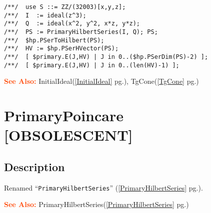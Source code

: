 \documentclass[a4paper]{mybook}
\newenvironment{command}{}{} %
\newcommand\SeeAlso{\par\textcolor{OrangeRed}{\textbf{\large See Also: }}}
\begin{document}
\begin{command}
\begin{Verbatim}[label=example, rulecolor=\color{PineGreen}, frame=single]
/**/  use S ::= ZZ/(32003)[x,y,z];
/**/  I  := ideal(z^3);
/**/  Q  := ideal(x^2, y^2, x*z, y*z);
/**/  PS := PrimaryHilbertSeries(I, Q); PS;
/**/  $hp.PSerToHilbert(PS);
/**/  HV := $hp.PSerHVector(PS);
/**/  [ $primary.E(J,HV) | J in 0..($hp.PSerDim(PS)-2) ];
/**/  [ $primary.E(J,HV) | J in 0..(len(HV)-1) ];
\end{Verbatim}


\SeeAlso %
  InitialIdeal(\ref{InitialIdeal} pg.\pageref{InitialIdeal}), 
    TgCone(\ref{TgCone} pg.\pageref{TgCone})
\end{command} %

\section{PrimaryPoincare [OBSOLESCENT]}
\label{PrimaryPoincare [OBSOLESCENT]}
\begin{command} %



\subsection*{Description}

Renamed ``\verb&PrimaryHilbertSeries&'' (\ref{PrimaryHilbertSeries} pg.\pageref{PrimaryHilbertSeries}).

\SeeAlso %
  PrimaryHilbertSeries(\ref{PrimaryHilbertSeries} pg.\pageref{PrimaryHilbertSeries})
\end{command} %
\end{document}
